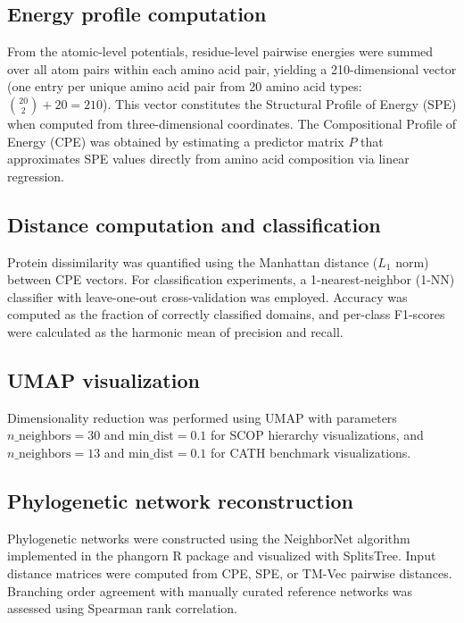\documentclass[11pt]{article}
\begin{document}
\subsection{Energy profile computation}

From the atomic-level potentials, residue-level pairwise energies were summed over all atom pairs within each amino acid pair, yielding a 210-dimensional vector (one entry per unique amino acid pair from 20 amino acid types: $\binom{20}{2} + 20 = 210$). This vector constitutes the Structural Profile of Energy (SPE) when computed from three-dimensional coordinates. The Compositional Profile of Energy (CPE) was obtained by estimating a predictor matrix $P$ that approximates SPE values directly from amino acid composition via linear regression.

\subsection{Distance computation and classification}

Protein dissimilarity was quantified using the Manhattan distance ($L_1$ norm) between CPE vectors. For classification experiments, a 1-nearest-neighbor (1-NN) classifier with leave-one-out cross-validation was employed. Accuracy was computed as the fraction of correctly classified domains, and per-class F1-scores were calculated as the harmonic mean of precision and recall.

\subsection{UMAP visualization}

Dimensionality reduction was performed using UMAP \citep{mcinnes2018} with parameters $n\_{\text{neighbors}} = 30$ and $\text{min\_dist} = 0.1$ for SCOP hierarchy visualizations, and $n\_{\text{neighbors}} = 13$ and $\text{min\_dist} = 0.1$ for CATH benchmark visualizations.

\subsection{Phylogenetic network reconstruction}

Phylogenetic networks were constructed using the NeighborNet algorithm \citep{bryant2004} implemented in the phangorn R package \citep{schliep2011} and visualized with SplitsTree. Input distance matrices were computed from CPE, SPE, or TM-Vec pairwise distances. Branching order agreement with manually curated reference networks was assessed using Spearman rank correlation.
\end{document}
